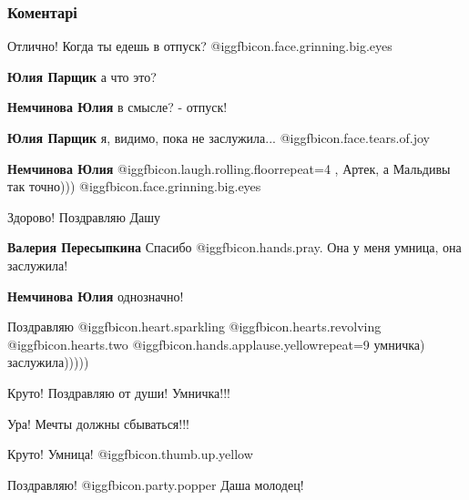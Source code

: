  
 
 
 
 
\subsubsection{Коментарі}

\begin{itemize} %
Отлично! Когда ты едешь в отпуск? @igg{fbicon.face.grinning.big.eyes} 

\begin{itemize} %
\textbf{Юлия Парщик} а что это?

\textbf{Немчинова Юлия} в смысле? - отпуск!

\textbf{Юлия Парщик} я, видимо, пока не заслужила...  @igg{fbicon.face.tears.of.joy} 

\textbf{Немчинова Юлия}  @igg{fbicon.laugh.rolling.floor}{repeat=4} , Артек, а Мальдивы так точно))) @igg{fbicon.face.grinning.big.eyes} 
\end{itemize} %

Здорово! Поздравляю Дашу

\begin{itemize} %
\textbf{Валерия Пересыпкина} Спасибо  @igg{fbicon.hands.pray}. Она у меня умница, она заслужила!

\textbf{Немчинова Юлия} однозначно!
\end{itemize} %

Поздравляю  @igg{fbicon.heart.sparkling}  @igg{fbicon.hearts.revolving}  @igg{fbicon.hearts.two}  @igg{fbicon.hands.applause.yellow}{repeat=9} умничка) заслужила)))))

Круто! Поздравляю от души! Умничка!!!

Ура! Мечты должны сбываться!!!

Круто! Умница! @igg{fbicon.thumb.up.yellow} 

Поздравляю! @igg{fbicon.party.popper}  Даша молодец!


\end{itemize}

